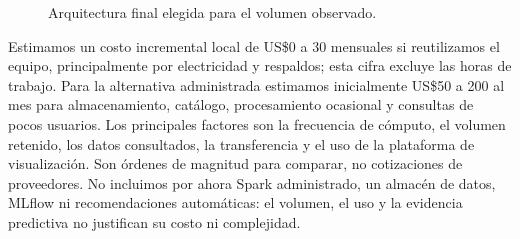 \documentclass[11pt]{article}
\begin{document}
\begin{figure}[h]
\centering
{}
\caption{Arquitectura final elegida para el volumen observado.}
\end{figure}

Estimamos un costo incremental local de US\$0 a 30 mensuales si reutilizamos el equipo, principalmente por electricidad y respaldos; esta cifra excluye las horas de trabajo. Para la alternativa administrada estimamos inicialmente US\$50 a 200 al mes para almacenamiento, catálogo, procesamiento ocasional y consultas de pocos usuarios. Los principales factores son la frecuencia de cómputo, el volumen retenido, los datos consultados, la transferencia y el uso de la plataforma de visualización. Son órdenes de magnitud para comparar, no cotizaciones de proveedores. No incluimos por ahora Spark administrado, un almacén de datos, MLflow ni recomendaciones automáticas: el volumen, el uso y la evidencia predictiva no justifican su costo ni complejidad.
\end{document}
